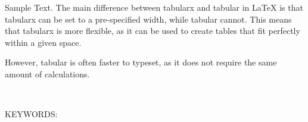 \thispagestyle{plain}    %

Sample Text. The main difference between tabularx and tabular in LaTeX is that tabularx can be set to a pre-specified width, while tabular cannot. This means that tabularx is more flexible, as it can be used to create tables that fit perfectly within a given space.

However, tabular is often faster to typeset, as it does not require the same amount of calculations.

\

\noindent
KEYWORDS:
